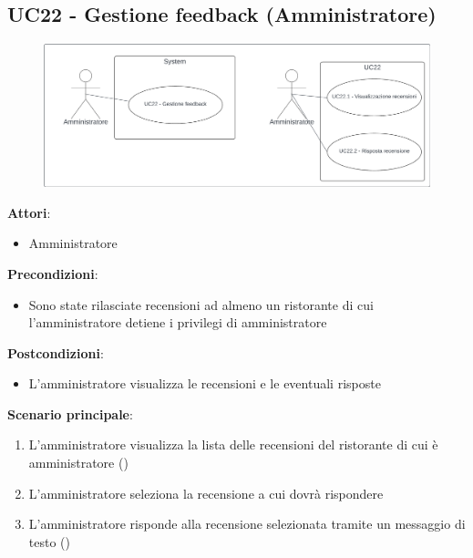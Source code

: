 \subsection{UC22 - Gestione feedback (Amministratore)}\label{usecase2:22}
\begin{figure}[H]
    \centering
    \includegraphics[width=0.9\linewidth]{ucd/ucd22.png}
\end{figure}
\textbf{Attori}:
\begin{itemize}
    \item Amministratore
\end{itemize}
\textbf{Precondizioni}:
\begin{itemize}
    \item Sono state rilasciate recensioni ad almeno un ristorante di cui l'amministratore detiene i privilegi di amministratore
\end{itemize}
\textbf{Postcondizioni}:
\begin{itemize}
    \item L'amministratore visualizza le recensioni e le eventuali risposte
\end{itemize}
\textbf{Scenario principale}:
\begin{enumerate}
    \item L'amministratore visualizza la lista delle recensioni del ristorante di cui è amministratore ()
    \item L'amministratore seleziona la recensione a cui dovrà rispondere
    \item L'amministratore risponde alla recensione selezionata tramite un messaggio di testo ()
\end{enumerate}